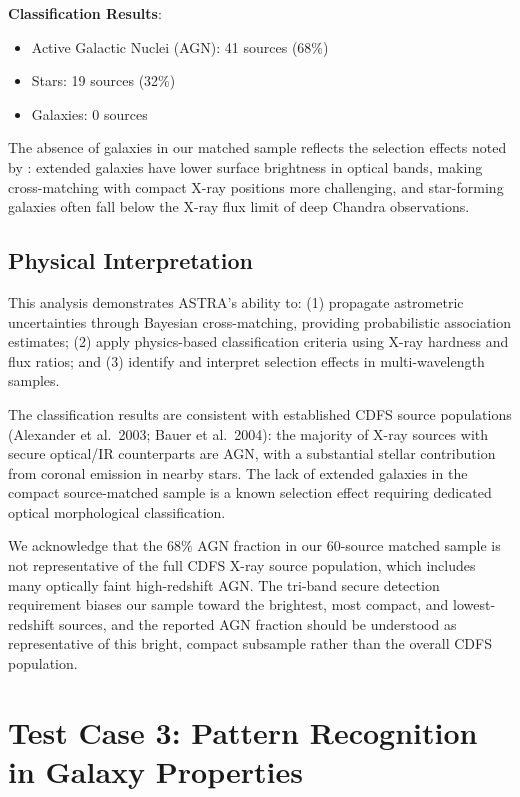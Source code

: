 \documentclass[usenatbib]{rasti}
\begin{document}
\textbf{Classification Results}:
\begin{itemize}
\item Active Galactic Nuclei (AGN): 41 sources (68\%)
\item Stars: 19 sources (32\%)
\item Galaxies: 0 sources
\end{itemize}

The absence of galaxies in our matched sample reflects the selection effects noted by \cite{bauer2004}: extended galaxies have lower surface brightness in optical bands, making cross-matching with compact X-ray positions more challenging, and star-forming galaxies often fall below the X-ray flux limit of deep Chandra observations.

\subsection{Physical Interpretation}

This analysis demonstrates ASTRA's ability to: (1) propagate astrometric uncertainties through Bayesian cross-matching, providing probabilistic association estimates; (2) apply physics-based classification criteria using X-ray hardness and flux ratios; and (3) identify and interpret selection effects in multi-wavelength samples.

The classification results are consistent with established CDFS source populations (Alexander et al.~2003; Bauer et al.~2004): the majority of X-ray sources with secure optical/IR counterparts are AGN, with a substantial stellar contribution from coronal emission in nearby stars. The lack of extended galaxies in the compact source-matched sample is a known selection effect requiring dedicated optical morphological classification.

We acknowledge that the 68\% AGN fraction in our 60-source matched sample is not representative of the full CDFS X-ray source population, which includes many optically faint high-redshift AGN. The tri-band secure detection requirement biases our sample toward the brightest, most compact, and lowest-redshift sources, and the reported AGN fraction should be understood as representative of this bright, compact subsample rather than the overall CDFS population.

\section{Test Case 3: Pattern Recognition in Galaxy Properties}
\end{document}

